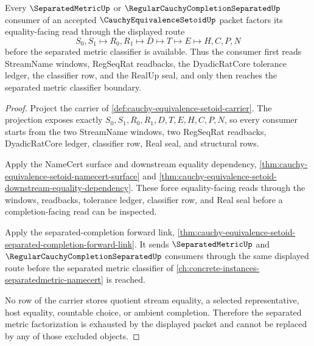 \begin{theorem}
\label{thm:cauchy-equivalence-setoid-separated-metric-factorization}
Every $\SeparatedMetricUp$ or $\RegularCauchyCompletionSeparatedUp$ consumer of an accepted $\CauchyEquivalenceSetoidUp$ packet factors its equality-facing read through the displayed route
$$
S_0,S_1 \longmapsto R_0,R_1 \longmapsto D \longmapsto T \longmapsto E \longmapsto H,C,P,N
$$
before the separated metric classifier is available. Thus the consumer first reads StreamName windows, RegSeqRat readbacks, the DyadicRatCore tolerance ledger, the classifier row, and the RealUp seal, and only then reaches the separated metric classifier boundary.
\end{theorem}
\begin{proof}
Project the carrier of \autoref{def:cauchy-equivalence-setoid-carrier}. The projection exposes exactly $S_0,S_1,R_0,R_1,D,T,E,H,C,P,N$, so every consumer starts from the two StreamName windows, two RegSeqRat readbacks, DyadicRatCore ledger, classifier row, Real seal, and structural rows.

Apply the NameCert surface and downstream equality dependency, \autoref{thm:cauchy-equivalence-setoid-namecert-surface} and \autoref{thm:cauchy-equivalence-setoid-downstream-equality-dependency}. These force equality-facing reads through the windows, readbacks, tolerance ledger, classifier row, and Real seal before a completion-facing read can be inspected.

Apply the separated-completion forward link, \autoref{thm:cauchy-equivalence-setoid-separated-completion-forward-link}. It sends $\SeparatedMetricUp$ and $\RegularCauchyCompletionSeparatedUp$ consumers through the same displayed route before the separated metric classifier of \autoref{ch:concrete-instances-separatedmetric-namecert} is reached.

No row of the carrier stores quotient stream equality, a selected representative, host equality, countable choice, or ambient completion. Therefore the separated metric factorization is exhausted by the displayed packet and cannot be replaced by any of those excluded objects.
\end{proof}

